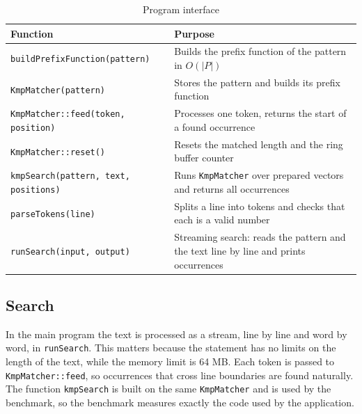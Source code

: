 \begin{table}[!ht]
\centering
\begin{tabular}{|l|P{7cm}|}
\hline
{}
Function & Purpose \\
\hline
\texttt{buildPrefixFunction(pattern)} & Builds the prefix function of the pattern in $O(|P|)$ \\
\hline
\texttt{KmpMatcher(pattern)} & Stores the pattern and builds its prefix function \\
\hline
\texttt{KmpMatcher::feed(token, position)} & Processes one token, returns the start of a found occurrence \\
\hline
\texttt{KmpMatcher::reset()} & Resets the matched length and the ring buffer counter \\
\hline
\texttt{kmpSearch(pattern, text, positions)} & Runs \texttt{KmpMatcher} over prepared vectors and returns all occurrences \\
\hline
\texttt{parseTokens(line)} & Splits a line into tokens and checks that each is a valid number \\
\hline
\texttt{runSearch(input, output)} & Streaming search: reads the pattern and the text line by line and prints occurrences \\
\hline
\end{tabular}
\caption{Program interface}
\end{table}

\subsection{Search}

In the main program the text is processed as a stream, line by line and word by word, in
\texttt{runSearch}. This matters because the statement has no limits on the length of the text,
while the memory limit is 64 MB. Each token is passed to \texttt{KmpMatcher::feed}, so occurrences
that cross line boundaries are found naturally. The function \texttt{kmpSearch} is built on the
same \texttt{KmpMatcher} and is used by the benchmark, so the benchmark measures exactly the code
used by the application.









